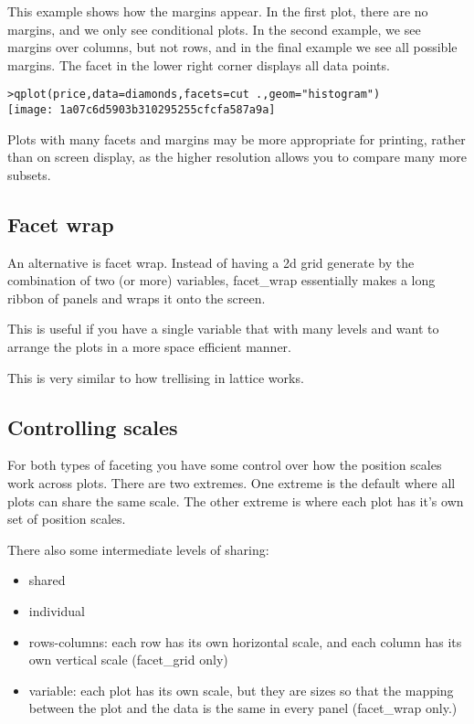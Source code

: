 This example shows how the margins appear.  In the first plot, there are no margins, and we only see conditional plots.  In the second example, we see margins over columns, but not rows, and in the final example we see all possible margins.  The facet in the lower right corner displays all data points.

\begin{alltt}
> qplot(price, data = diamonds, facets = cut ~ ., geom = "histogram")
\texttt{[image: 1a07c6d5903b310295255cfcfa587a9a]}

\end{alltt}

Plots with many facets and margins may be more appropriate for printing, rather than on screen display, as the higher resolution allows you to compare many more subsets.

\subsection{Facet wrap}
\label{sub:facet_wrap}

An alternative is facet wrap.  Instead of having a 2d grid generate by the combination of two (or more) variables, facet\_wrap essentially makes a long ribbon of panels and wraps it onto the screen.  

This is useful if you have a single variable that with many levels and want to arrange the plots in a more space efficient manner.

This is very similar to how trellising in lattice works.

\subsection{Controlling scales}
\label{sub:controlling_scales}

For both types of faceting you have some control over how the position scales work across plots.  There are two extremes.  One extreme is the default where all plots can share the same scale.  The other extreme is where each plot has it's own set of position scales.  

There also some intermediate levels of sharing:

\begin{itemize}
  \item shared
  \item individual
  \item rows-columns: each row has its own horizontal scale, and each column has its own vertical scale (facet\_grid only)
  \item variable: each plot has its own scale, but they are sizes so that the mapping between the plot and the data is the same in every panel (facet\_wrap only.)
\end{itemize}



